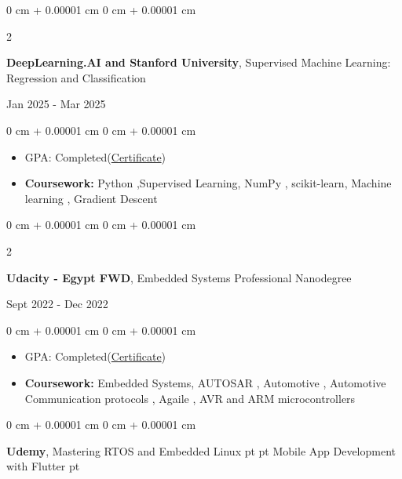 \documentclass[10pt, letterpaper]{article}
\newenvironment{highlights}{
    \begin{itemize}[
        topsep=0.10 cm,
        parsep=0.10 cm,
        partopsep=0pt,
        itemsep=0pt,
        leftmargin=0 cm + 10pt
    ]
}{
    \end{itemize}
} %
\newenvironment{onecolentry}{
    \begin{adjustwidth}{
        0 cm + 0.00001 cm
    }{
        0 cm + 0.00001 cm
    }
}{
    \end{adjustwidth}
} %
\newenvironment{twocolentry}[2][]{
    \onecolentry
    \def\secondColumn{#2}
    \setcolumnwidth{\fill, 4.5 cm}
    \begin{paracol}{2}
}{
    \switchcolumn \raggedleft \secondColumn
    \end{paracol}
    \endonecolentry
} %
\begin{document}
            \begin{twocolentry}{
                Jan 2025 - Mar 2025
            }
                \textbf{DeepLearning.AI and Stanford University}, Supervised Machine Learning: Regression and Classification
            \end{twocolentry}

            \vspace{0.10 cm}
            \begin{onecolentry}
                \begin{highlights}
                    \item GPA: 
                    Completed(\href{https://coursera.org/verify/968W8PWXYICQ}{Certificate})
                \item \textbf{Coursework:} Python ,Supervised Learning, NumPy , scikit-learn, Machine learning  , Gradient Descent
                \end{highlights}
            \end{onecolentry}
            
            \begin{twocolentry}{
                Sept 2022 - Dec 2022
            }
                \textbf{Udacity - Egypt FWD}, Embedded Systems Professional Nanodegree
            \end{twocolentry}

            \vspace{0.10 cm}
            \begin{onecolentry}
                \begin{highlights}
                    \item GPA: 
                    Completed(\href{https://drive.google.com/file/d/1qg4IM_zmd8Wyk5V9Xo05Ln9YCU90FEMU/view?usp=share_link}{Certificate})
                \item \textbf{Coursework:} Embedded Systems, AUTOSAR , Automotive , Automotive Communication protocols , Agaile , AVR and ARM microcontrollers
                \end{highlights}
            \end{onecolentry}
            
                                    \begin{onecolentry}
                                    \textbf{Udemy}, Mastering RTOS and Embedded Linux
                                         pt%
                                            \AND%
                                             pt%
                                            Mobile App Development with Flutter
                                         pt%
                                \end{onecolentry}
                                \vspace{0.10 cm}
                                
\end{document}

